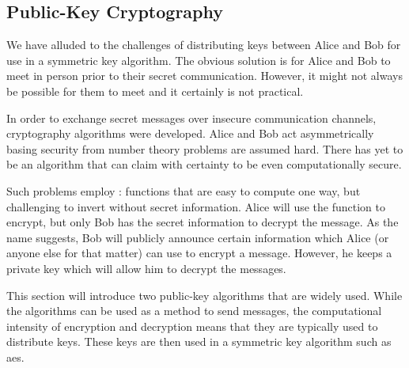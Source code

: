 



\subsection{Public-Key Cryptography}

We have alluded to the challenges of distributing keys between Alice and Bob for use in a symmetric key algorithm. The obvious solution is for Alice and Bob to meet in person prior to their secret communication. However, it might not always be possible for them to meet and it certainly is not practical. 

In order to exchange secret messages over insecure communication channels,  cryptography algorithms were developed. Alice and Bob act asymmetrically basing security from number theory problems are assumed hard. There has yet to be an algorithm that can claim with certainty to be even computationally secure.

Such problems employ : functions that are easy to compute one way, but challenging to invert without secret information. Alice will use the function to encrypt, but only Bob has the secret information to decrypt the message. As the name suggests, Bob will publicly announce certain information which Alice (or anyone else for that matter) can use to encrypt a message. However, he keeps a private key which will allow him to decrypt the messages.

This section will introduce two public-key algorithms that are widely used. While the algorithms can be used as a method to send messages, the computational intensity of encryption and decryption means that they are typically used to distribute keys. These keys are then used in a symmetric key algorithm such as \ac{aes}.

